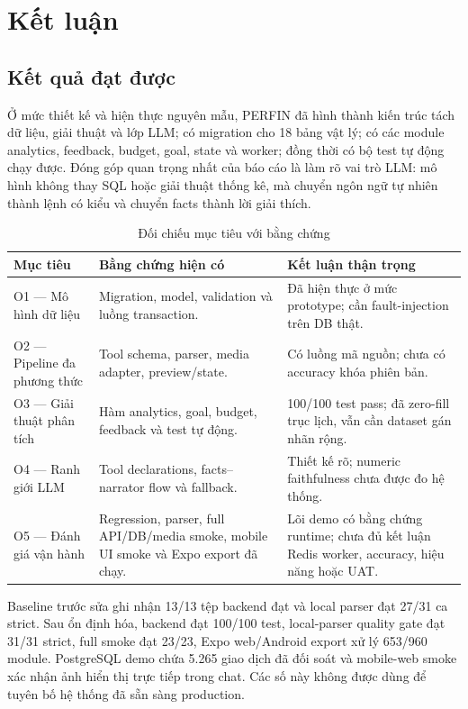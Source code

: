 \chapter{Kết luận}
\label{chap:conclusion}

\section{Kết quả đạt được}

Ở mức thiết kế và hiện thực nguyên mẫu, PERFIN đã hình thành kiến trúc tách dữ liệu, giải thuật và lớp LLM; có migration cho 18 bảng vật lý; có các module analytics, feedback, budget, goal, state và worker; đồng thời có bộ test tự động chạy được. Đóng góp quan trọng nhất của báo cáo là làm rõ vai trò LLM: mô hình không thay SQL hoặc giải thuật thống kê, mà chuyển ngôn ngữ tự nhiên thành lệnh có kiểu và chuyển facts thành lời giải thích.

\begin{table}[H]
  \centering
  \caption{Đối chiếu mục tiêu với bằng chứng}
  \label{tab:objective-evidence}
  \begin{tabularx}{\textwidth}{@{}L{3.6cm}Y Y@{}}
    \toprule
    \textbf{Mục tiêu} & \textbf{Bằng chứng hiện có} & \textbf{Kết luận thận trọng} \\
    \midrule
    O1 --- Mô hình dữ liệu & Migration, model, validation và luồng transaction. & Đã hiện thực ở mức prototype; cần fault-injection trên DB thật. \\
    O2 --- Pipeline đa phương thức & Tool schema, parser, media adapter, preview/state. & Có luồng mã nguồn; chưa có accuracy khóa phiên bản. \\
    O3 --- Giải thuật phân tích & Hàm analytics, goal, budget, feedback và test tự động. & 100/100 test pass; đã zero-fill trục lịch, vẫn cần dataset gán nhãn rộng. \\
    O4 --- Ranh giới LLM & Tool declarations, facts--narrator flow và fallback. & Thiết kế rõ; numeric faithfulness chưa được đo hệ thống. \\
    O5 --- Đánh giá vận hành & Regression, parser, full API/DB/media smoke, mobile UI smoke và Expo export đã chạy. & Lõi demo có bằng chứng runtime; chưa đủ kết luận Redis worker, accuracy, hiệu năng hoặc UAT. \\
    \bottomrule
  \end{tabularx}
\end{table}

Baseline trước sửa ghi nhận 13/13 tệp backend đạt và local parser đạt 27/31 ca strict. Sau ổn định hóa, backend đạt 100/100 test, local-parser quality gate đạt 31/31 strict, full smoke đạt 23/23, Expo web/Android export xử lý 653/960 module. PostgreSQL demo chứa 5.265 giao dịch đã đối soát và mobile-web smoke xác nhận ảnh hiển thị trực tiếp trong chat. Các số này không được dùng để tuyên bố hệ thống đã sẵn sàng production.

